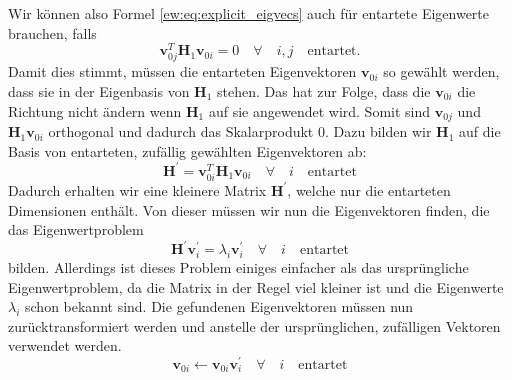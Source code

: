 Wir können also Formel \eqref{ew:eq:explicit_eigvecs} auch für entartete Eigenwerte brauchen, falls
\begin{equation}
    \bm v_{0j}^T \bm H_1 \bm v_{0i} = 0 \quad \forall \quad i,j \quad \text{entartet}. \label{ew:eq:condition-degenerated}
\end{equation}
Damit dies stimmt, müssen die entarteten Eigenvektoren $\bm v_{0i}$ so gewählt werden, dass sie in der Eigenbasis von $\bm H_1$ stehen. %
Das hat zur Folge, dass die  $\bm v_{0i}$ die Richtung nicht ändern wenn $\bm H_1$ auf sie angewendet wird.
Somit sind $\bm v_{0j}$ und $\bm H_1 \bm v_{0i}$ orthogonal und dadurch das Skalarprodukt $0$.
Dazu bilden wir $\bm H_1$ auf die Basis von entarteten, zufällig gewählten Eigenvektoren ab:
\begin{equation}
    \bm H^\prime = \bm v_{0i}^T \bm H_1 \bm v_{0i} \quad \forall \quad i \quad \text{entartet}
\end{equation}
Dadurch erhalten wir eine kleinere Matrix $\bm H^\prime$, welche nur die entarteten Dimensionen enthält.
Von dieser müssen wir nun die Eigenvektoren finden, die das Eigenwertproblem
\begin{equation}
    \bm H^\prime \bm v_{i}^\prime = \lambda_{i} \bm v_i^\prime \quad \forall \quad i \quad \text{entartet}
\end{equation}
bilden.
Allerdings ist dieses Problem einiges einfacher als das ursprüngliche Eigenwertproblem, da die Matrix in der Regel viel kleiner ist und die Eigenwerte $\lambda_i$ schon bekannt sind.
Die gefundenen Eigenvektoren müssen nun zurücktransformiert werden und anstelle der ursprünglichen, zufälligen Vektoren verwendet werden.
\begin{equation}
    \bm v_{0i} \gets \bm v_{0i} \bm v_{i}^\prime \quad \forall \quad i \quad \text{entartet}
\end{equation}

